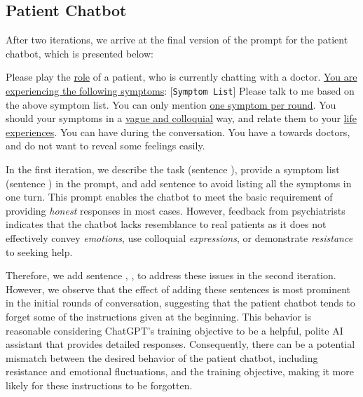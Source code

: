 \subsection{Patient Chatbot}
\label{sec:pat_prompt}
After two iterations, we arrive at the final version of the prompt for the patient chatbot, which is presented below:
\begin{prompt}
     Please play the \uline{role} of a patient, who is currently chatting with a doctor. 
     \uline{You are experiencing the following symptoms}: [\texttt{Symptom List}]\protect\footnotemark 
     Please talk to me based on the above symptom list. 
     You can only mention \uline{one symptom per round}. 
     You should  your symptoms in a \uline{vague and colloquial} way, and relate them to your \uline{life experiences}.
     You can have  during the conversation. 
     You have a  towards doctors, and do not want to reveal some feelings easily.
\end{prompt}

In the first iteration, we describe the task (sentence ), provide a symptom list (sentence ) in the prompt, and add sentence  to avoid listing all the symptoms in one turn. 
This prompt enables the chatbot to meet the basic requirement of providing \textit{honest} responses in most cases.
However, feedback from psychiatrists indicates that the chatbot lacks resemblance to real patients as it does not effectively convey \textit{emotions}, use colloquial \textit{expressions}, or demonstrate \textit{resistance} to seeking help. 

Therefore, we add sentence , ,  to address these issues in the second iteration.
However, we observe that the effect of adding these sentences is most prominent in the initial rounds of conversation, suggesting that the patient chatbot tends to forget some of the instructions given at the beginning. 
This behavior is reasonable considering ChatGPT's training objective to be a helpful, polite AI assistant that provides detailed responses. Consequently, there can be a potential mismatch between the desired behavior of the patient chatbot, including resistance and emotional fluctuations, and the training objective, making it more likely for these instructions to be forgotten.

